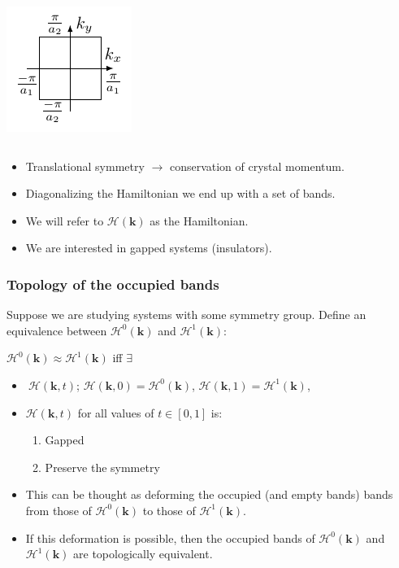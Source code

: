 \documentclass{beamer}
\newcommand{\mc}{\mathcal}
\renewcommand{\(}{\left(}
\renewcommand{\)}{\right)}
\renewcommand{\[}{\left[}
\renewcommand{\]}{\right]}
\begin{document}
\begin{frame}
\begin{columns}
\begin{column}{0.3\textwidth}
            \centering
            \includegraphics[]{square_recep_lattice.pdf}
            \vfill
        \end{column}
    \end{columns}
    \begin{itemize}
        \item Translational symmetry $\rightarrow$ conservation of crystal momentum.
        \item Diagonalizing the Hamiltonian we end up with a set of bands. 
        \item We will refer to $\mc H(\bm k)$ as the Hamiltonian.
        \item We are interested in gapped systems (insulators).
    \end{itemize}
\end{frame}
\begin{frame}
    \frametitle{Topology of the occupied bands}
    Suppose we are studying systems with some symmetry group. Define an equivalence between $\mc H^0(\bm k)$ and $\mc H^1(\bm k)$:
    \begin{framed}
        \begin{center}
            $\mc H^0(\bm k) \approx \mc H^1(\bm k)$ iff $\exists$
        \end{center}
        \begin{itemize}
            \item $\ \mc H(\bm k, t)$;  $\mc H(\bm k,0) = \mc H^0(\bm k)$, $\mc H(\bm k,1) = \mc H^1(\bm k)$, 
            \item $\mc H(\bm k,t)$ for all values of $t \in [0,1]$ is: 
            \begin{enumerate}
                \item Gapped
                \item Preserve the symmetry
            \end{enumerate}
        \end{itemize}
    \end{framed}  \pause
    \begin{itemize}
        \item This can be thought as deforming the occupied (and empty bands) bands from those of $\mc H^0(\bm k)$ to those of $\mc H^1(\bm k)$. 
        \item If this deformation is possible, then the occupied bands of $\mc H^0(\bm k)$ and $\mc H^1(\bm k)$ are topologically equivalent.
    \end{itemize}
\end{frame}
\end{document}
